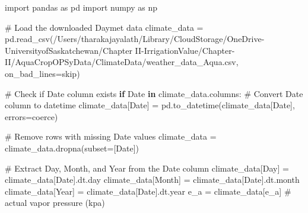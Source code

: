 \documentclass[
  letterpaper,
  DIV=11,
  numbers=noendperiod]{scrartcl}
\newenvironment{Shaded}{\begin{snugshade}}{\end{snugshade}}
\newcommand{\CommentTok}[1]{\textcolor[rgb]{0.37,0.37,0.37}{#1}}
\newcommand{\ControlFlowTok}[1]{\textcolor[rgb]{0.00,0.23,0.31}{\textbf{#1}}}
\newcommand{\ImportTok}[1]{\textcolor[rgb]{0.00,0.46,0.62}{#1}}
\newcommand{\KeywordTok}[1]{\textcolor[rgb]{0.00,0.23,0.31}{\textbf{#1}}}
\newcommand{\NormalTok}[1]{\textcolor[rgb]{0.00,0.23,0.31}{#1}}
\newcommand{\OperatorTok}[1]{\textcolor[rgb]{0.37,0.37,0.37}{#1}}
\newcommand{\StringTok}[1]{\textcolor[rgb]{0.13,0.47,0.30}{#1}}
\begin{document}
\begin{Shaded}
\begin{Highlighting}[]
\ImportTok{import}\NormalTok{ pandas }\ImportTok{as}\NormalTok{ pd}
\ImportTok{import}\NormalTok{ numpy }\ImportTok{as}\NormalTok{ np}

\CommentTok{\# Load the downloaded Daymet data}
\NormalTok{climate\_data }\OperatorTok{=}\NormalTok{ pd.read\_csv(}\StringTok{\textquotesingle{}/Users/tharakajayalath/Library/CloudStorage/OneDrive{-}UniversityofSaskatchewan/Chapter II{-}IrrigationValue/Chapter{-}II/AquaCropOPSyData/ClimateData/weather\_data\_Aqua.csv\textquotesingle{}}\NormalTok{, on\_bad\_lines}\OperatorTok{=}\StringTok{\textquotesingle{}skip\textquotesingle{}}\NormalTok{)}

\CommentTok{\# Check if \textquotesingle{}Date\textquotesingle{} column exists}
\ControlFlowTok{if} \StringTok{\textquotesingle{}Date\textquotesingle{}} \KeywordTok{in}\NormalTok{ climate\_data.columns:}
    \CommentTok{\# Convert \textquotesingle{}Date\textquotesingle{} column to datetime}
\NormalTok{    climate\_data[}\StringTok{\textquotesingle{}Date\textquotesingle{}}\NormalTok{] }\OperatorTok{=}\NormalTok{ pd.to\_datetime(climate\_data[}\StringTok{\textquotesingle{}Date\textquotesingle{}}\NormalTok{], errors}\OperatorTok{=}\StringTok{\textquotesingle{}coerce\textquotesingle{}}\NormalTok{)}

    \CommentTok{\# Remove rows with missing Date values}
\NormalTok{    climate\_data }\OperatorTok{=}\NormalTok{ climate\_data.dropna(subset}\OperatorTok{=}\NormalTok{[}\StringTok{\textquotesingle{}Date\textquotesingle{}}\NormalTok{])}

    \CommentTok{\# Extract Day, Month, and Year from the Date column}
\NormalTok{    climate\_data[}\StringTok{\textquotesingle{}Day\textquotesingle{}}\NormalTok{] }\OperatorTok{=}\NormalTok{ climate\_data[}\StringTok{\textquotesingle{}Date\textquotesingle{}}\NormalTok{].dt.day}
\NormalTok{    climate\_data[}\StringTok{\textquotesingle{}Month\textquotesingle{}}\NormalTok{] }\OperatorTok{=}\NormalTok{ climate\_data[}\StringTok{\textquotesingle{}Date\textquotesingle{}}\NormalTok{].dt.month}
\NormalTok{    climate\_data[}\StringTok{\textquotesingle{}Year\textquotesingle{}}\NormalTok{] }\OperatorTok{=}\NormalTok{ climate\_data[}\StringTok{\textquotesingle{}Date\textquotesingle{}}\NormalTok{].dt.year}
\NormalTok{    e\_a }\OperatorTok{=}\NormalTok{ climate\_data[}\StringTok{\textquotesingle{}e\_a\textquotesingle{}}\NormalTok{]  }\CommentTok{\# actual vapor pressure (kpa)}


\end{Highlighting}
\end{Shaded}
\end{document}
